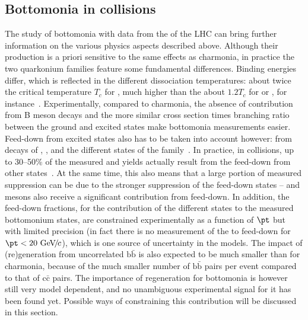 \documentclass[../report.tex]{subfiles}
\begin{document}

\subsection{Bottomonia in \PbPb collisions}%


The study of bottomonia with \PbPb data from the \RunsThreeFour of the LHC can bring further information on the various physics aspects described above.
Although their production is a priori sensitive to the same effects as charmonia, in practice the two quarkonium families feature some fundamental differences.
Binding energies differ, which is reflected in the different dissociation temperatures: about twice the critical temperature $T_c$ for , much higher than the about
$1.2 T_c$ for \PJgy or , for instance~\cite{Mocsy:2007jz}. Experimentally, compared to charmonia, the absence of contribution from B meson decays and the more similar cross section times branching ratio between the ground and excited states make bottomonia measurements easier. Feed-down from excited states also has to be taken into account however: from decays of , , and the different states of the \PGcb family~\cite{Andronic:2015wma}. In practice, in \pp collisions, up to 30--50\% of the measured 
 and  yields actually result from the feed-down from other states~\cite{Andronic:2015wma,Aaij:2014caa}. At the same time, this also means that
a large portion of measured  suppression can be due to the stronger suppression of the feed-down states --  and  mesons also receive a significant contribution from feed-down.
In addition, the feed-down fractions, for the contribution of the 
different states to the measured bottomonium states, are constrained experimentally as a function of $\pt$ but with limited precision (in fact there is no measurement of the  to  feed-down for $\pt<20\UGeVc$), which is one source of uncertainty in the models.
The impact of (re)generation from uncorrelated $\text{b}\bar{\text{b}}$ is also expected to be much smaller than for charmonia, because of the much smaller number of $\text{b}\bar{\text{b}}$
pairs per \PbPb event compared to that of $\text{c}\bar{\text{c}}$ pairs. The importance of regeneration for bottomonia is however still very model dependent, and no unambiguous experimental signal
for it has been found yet. Possible ways of constraining this contribution will be discussed in this section.
\end{document}
